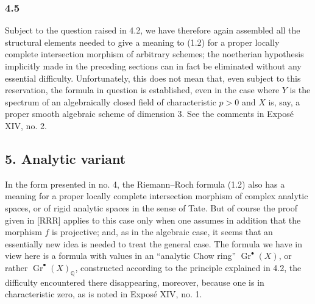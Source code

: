 \documentclass[11pt]{article}
\newcommand{\Gr}{\operatorname{Gr}}
\begin{document}
\subsubsection*{4.5}
Subject to the question raised in 4.2, we have therefore again assembled all the structural elements needed to give a meaning to (1.2) for a proper locally complete intersection morphism of arbitrary schemes; the noetherian hypothesis implicitly made in the preceding sections can in fact be eliminated without any essential difficulty. Unfortunately, this does not mean that, even subject to this reservation, the formula in question is established, even in the case where $Y$ is the spectrum of an algebraically closed field of characteristic $p>0$ and $X$ is, say, a proper smooth algebraic scheme of dimension $3$. See the comments in Expos\'e XIV, no. 2.

\subsection*{5. Analytic variant}
In the form presented in no. 4, the Riemann--Roch formula (1.2) also has a meaning for a proper locally complete intersection morphism of complex analytic spaces, or of rigid analytic spaces in the sense of Tate. But of course the proof given in [RRR] applies to this case only when one assumes in addition that the morphism $f$ is projective; and, as in the algebraic case, it seems that an essentially new idea is needed to treat the general case. The formula we have in view here is a formula with values in an ``analytic Chow ring'' $\Gr^\bullet(X)$, or rather $\Gr^\bullet(X)_{\mathbb Q}$, constructed according to the principle explained in 4.2, the difficulty encountered there disappearing, moreover, because one is in characteristic zero, as is noted in Expos\'e XIV, no. 1.
\end{document}
